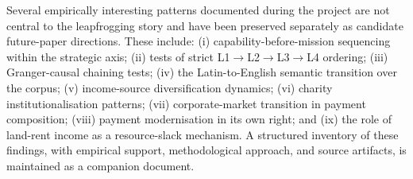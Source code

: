 \documentclass[11pt]{article}
\begin{document}
Several empirically interesting patterns documented during the project are not central to the leapfrogging story and have been preserved separately as candidate future-paper directions. These include: (i) capability-before-mission sequencing within the strategic axis; (ii) tests of strict L1$\rightarrow$L2$\rightarrow$L3$\rightarrow$L4 ordering; (iii) Granger-causal chaining tests; (iv) the Latin-to-English semantic transition over the corpus; (v) income-source diversification dynamics; (vi) charity institutionalisation patterns; (vii) corporate-market transition in payment composition; (viii) payment modernisation in its own right; and (ix) the role of land-rent income as a resource-slack mechanism. A structured inventory of these findings, with empirical support, methodological approach, and source artifacts, is maintained as a companion document.
\end{document}
